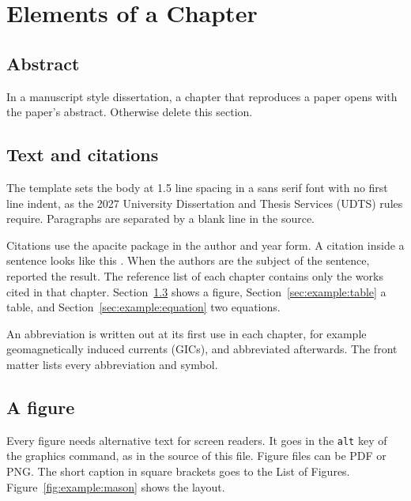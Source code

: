 \chapter{Elements of a Chapter}
\label{ch:example}

\section{Abstract}
\label{sec:example:abstract}

In a manuscript style dissertation, a chapter that reproduces a paper opens with the paper's abstract. Otherwise delete this section.

\section{Text and citations}
\label{sec:example:text}

The template sets the body at 1.5 line spacing in a sans serif font with no first line indent, as the 2027 University Dissertation and Thesis Services (UDTS) rules require. Paragraphs are separated by a blank line in the source.

Citations use the apacite package in the author and year form. A citation inside a sentence looks like this \cite{bor_systematic_2026}. When the authors are the subject of the sentence,  reported the result. The reference list of each chapter contains only the works cited in that chapter. Section~\ref{sec:example:figure} shows a figure, Section~\ref{sec:example:table} a table, and Section~\ref{sec:example:equation} two equations.

An abbreviation is written out at its first use in each chapter, for example geomagnetically induced currents (GICs), and abbreviated afterwards. The front matter lists every abbreviation and symbol.

\section{A figure}
\label{sec:example:figure}

Every figure needs alternative text for screen readers. It goes in the \verb|alt| key of the graphics command, as in the source of this file. Figure files can be PDF or PNG. The short caption in square brackets goes to the List of Figures. Figure~\ref{fig:example:mason} shows the layout.

